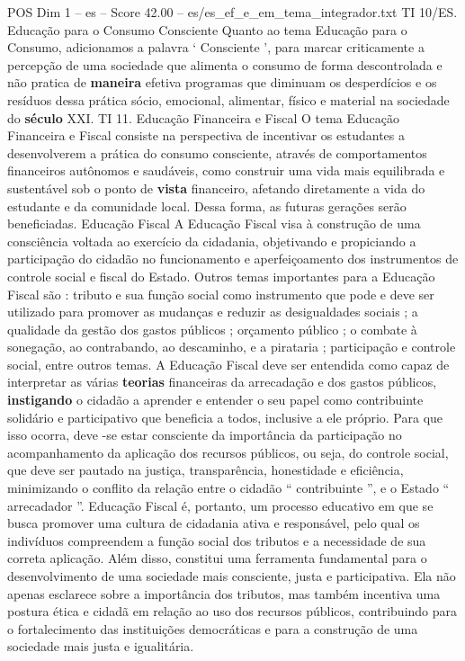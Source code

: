 \begin{textsample}{POS Dim 1 – es – Score 42.00 – es/es\_ef\_e\_em\_tema\_integrador.txt}
TI 10/ES.
Educação para o Consumo Consciente Quanto ao tema Educação para o Consumo, adicionamos a palavra ‘ Consciente ’, para marcar criticamente a percepção de uma sociedade que alimenta o consumo de forma descontrolada e não pratica de \textbf{maneira} efetiva programas que diminuam os desperdícios e os resíduos dessa prática sócio, emocional, alimentar, físico e material na sociedade do \textbf{século} XXI.
TI 11.
Educação Financeira e Fiscal O tema Educação Financeira e Fiscal consiste na perspectiva de incentivar os estudantes a desenvolverem a prática do consumo consciente, através de comportamentos financeiros autônomos e saudáveis, como construir uma vida mais equilibrada e sustentável sob o ponto de \textbf{vista} financeiro, afetando diretamente a vida do estudante e da comunidade local.
Dessa forma, as futuras gerações serão beneficiadas.
Educação Fiscal A Educação Fiscal visa à construção de uma consciência voltada ao exercício da cidadania, objetivando e propiciando a participação do cidadão no funcionamento e aperfeiçoamento dos instrumentos de controle social e fiscal do Estado.
Outros temas importantes para a Educação Fiscal são : tributo e sua função social como instrumento que pode e deve ser utilizado para promover as mudanças e reduzir as desigualdades sociais ; a qualidade da gestão dos gastos públicos ; orçamento público ; o combate à sonegação, ao contrabando, ao descaminho, e a pirataria ; participação e controle social, entre outros temas.
A Educação Fiscal deve ser entendida como capaz de interpretar as várias \textbf{teorias} financeiras da arrecadação e dos gastos públicos, \textbf{instigando} o cidadão a aprender e entender o seu papel como contribuinte solidário e participativo que beneficia a todos, inclusive a ele próprio.
Para que isso ocorra, deve -se estar consciente da importância da participação no acompanhamento da aplicação dos recursos públicos, ou seja, do controle social, que deve ser pautado na justiça, transparência, honestidade e eficiência, minimizando o conflito da relação entre o cidadão “ contribuinte ”, e o Estado “ arrecadador ”.
Educação Fiscal é, portanto, um processo educativo em que se busca promover uma cultura de cidadania ativa e responsável, pelo qual os indivíduos compreendem a função social dos tributos e a necessidade de sua correta aplicação.
Além disso, constitui uma ferramenta fundamental para o desenvolvimento de uma sociedade mais consciente, justa e participativa.
Ela não apenas esclarece sobre a importância dos tributos, mas também incentiva uma postura ética e cidadã em relação ao uso dos recursos públicos, contribuindo para o fortalecimento das instituições democráticas e para a construção de uma sociedade mais justa e igualitária.

\end{textsample}

